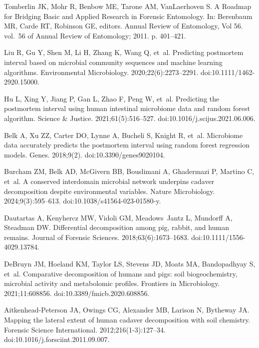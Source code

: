 \documentclass[
  10pt,
  letterpaper,
]{article}
\begin{document}
\begin{thebibliography}{10}
  Tomberlin JK, Mohr R, Benbow ME, Tarone AM, VanLaerhoven S.
  \newblock A {Roadmap} for {Bridging} {Basic} and {Applied} {Research} in
    {Forensic} {Entomology}.
  \newblock In: Berenbaum MR, Carde RT, Robinson GE, editors. Annual {Review} of
    {Entomology}, {Vol} 56. vol.~56 of Annual {Review} of {Entomology}; 2011. p.
    401--421.
  
  Liu R, Gu Y, Shen M, Li H, Zhang K, Wang Q, et~al.
  \newblock Predicting postmortem interval based on microbial community sequences
    and machine learning algorithms.
  \newblock Environmental Microbiology. 2020;22(6):2273--2291.
  \newblock doi:{10.1111/1462-2920.15000}.
  
  Hu L, Xing Y, Jiang P, Gan L, Zhao F, Peng W, et~al.
  \newblock Predicting the postmortem interval using human intestinal microbiome
    data and random forest algorithm.
  \newblock Science \& Justice. 2021;61(5):516--527.
  \newblock doi:{10.1016/j.scijus.2021.06.006}.
  
  Belk A, Xu ZZ, Carter DO, Lynne A, Bucheli S, Knight R, et~al.
  \newblock Microbiome data accurately predicts the postmortem interval using
    random forest regression models.
  \newblock Genes. 2018;9(2).
  \newblock doi:{10.3390/genes9020104}.
  
  Burcham ZM, Belk AD, McGivern BB, Bouslimani A, Ghadermazi P, Martino C, et~al.
  \newblock A conserved interdomain microbial network underpins cadaver
    decomposition despite environmental variables.
  \newblock Nature Microbiology. 2024;9(3):595--613.
  \newblock doi:{10.1038/s41564-023-01580-y}.
  
  Dautartas A, Kenyhercz MW, Vidoli GM, Meadows~Jantz L, Mundorff A, Steadman DW.
  \newblock Differential decomposition among pig, rabbit, and human remains.
  \newblock Journal of Forensic Sciences. 2018;63(6):1673--1683.
  \newblock doi:{10.1111/1556-4029.13784}.
  
  DeBruyn JM, Hoeland KM, Taylor LS, Stevens JD, Moats MA, Bandopadhyay S, et~al.
  \newblock Comparative decomposition of humans and pigs: soil biogeochemistry,
    microbial activity and metabolomic profiles.
  \newblock Frontiers in Microbiology. 2021;11:608856.
  \newblock doi:{10.3389/fmicb.2020.608856}.
  
  Aitkenhead-Peterson JA, Owings CG, Alexander MB, Larison N, Bytheway JA.
  \newblock Mapping the lateral extent of human cadaver decomposition with soil
    chemistry.
  \newblock Forensic Science International. 2012;216(1-3):127--34.
  \newblock doi:{10.1016/j.forsciint.2011.09.007}.
  

\end{thebibliography}
\end{document}
